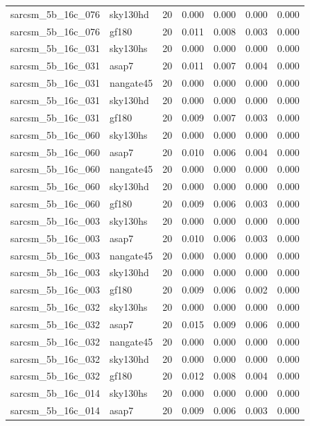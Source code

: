 \begin{tabular}{llrrrrr}
sarcsm\_5b\_16c\_076 & sky130hd & 20 & 0.000 & 0.000 & 0.000 & 0.000 \\
sarcsm\_5b\_16c\_076 & gf180 & 20 & 0.011 & 0.008 & 0.003 & 0.000 \\
sarcsm\_5b\_16c\_031 & sky130hs & 20 & 0.000 & 0.000 & 0.000 & 0.000 \\
sarcsm\_5b\_16c\_031 & asap7 & 20 & 0.011 & 0.007 & 0.004 & 0.000 \\
sarcsm\_5b\_16c\_031 & nangate45 & 20 & 0.000 & 0.000 & 0.000 & 0.000 \\
sarcsm\_5b\_16c\_031 & sky130hd & 20 & 0.000 & 0.000 & 0.000 & 0.000 \\
sarcsm\_5b\_16c\_031 & gf180 & 20 & 0.009 & 0.007 & 0.003 & 0.000 \\
sarcsm\_5b\_16c\_060 & sky130hs & 20 & 0.000 & 0.000 & 0.000 & 0.000 \\
sarcsm\_5b\_16c\_060 & asap7 & 20 & 0.010 & 0.006 & 0.004 & 0.000 \\
sarcsm\_5b\_16c\_060 & nangate45 & 20 & 0.000 & 0.000 & 0.000 & 0.000 \\
sarcsm\_5b\_16c\_060 & sky130hd & 20 & 0.000 & 0.000 & 0.000 & 0.000 \\
sarcsm\_5b\_16c\_060 & gf180 & 20 & 0.009 & 0.006 & 0.003 & 0.000 \\
sarcsm\_5b\_16c\_003 & sky130hs & 20 & 0.000 & 0.000 & 0.000 & 0.000 \\
sarcsm\_5b\_16c\_003 & asap7 & 20 & 0.010 & 0.006 & 0.003 & 0.000 \\
sarcsm\_5b\_16c\_003 & nangate45 & 20 & 0.000 & 0.000 & 0.000 & 0.000 \\
sarcsm\_5b\_16c\_003 & sky130hd & 20 & 0.000 & 0.000 & 0.000 & 0.000 \\
sarcsm\_5b\_16c\_003 & gf180 & 20 & 0.009 & 0.006 & 0.002 & 0.000 \\
sarcsm\_5b\_16c\_032 & sky130hs & 20 & 0.000 & 0.000 & 0.000 & 0.000 \\
sarcsm\_5b\_16c\_032 & asap7 & 20 & 0.015 & 0.009 & 0.006 & 0.000 \\
sarcsm\_5b\_16c\_032 & nangate45 & 20 & 0.000 & 0.000 & 0.000 & 0.000 \\
sarcsm\_5b\_16c\_032 & sky130hd & 20 & 0.000 & 0.000 & 0.000 & 0.000 \\
sarcsm\_5b\_16c\_032 & gf180 & 20 & 0.012 & 0.008 & 0.004 & 0.000 \\
sarcsm\_5b\_16c\_014 & sky130hs & 20 & 0.000 & 0.000 & 0.000 & 0.000 \\
sarcsm\_5b\_16c\_014 & asap7 & 20 & 0.009 & 0.006 & 0.003 & 0.000 \\

\end{tabular}
